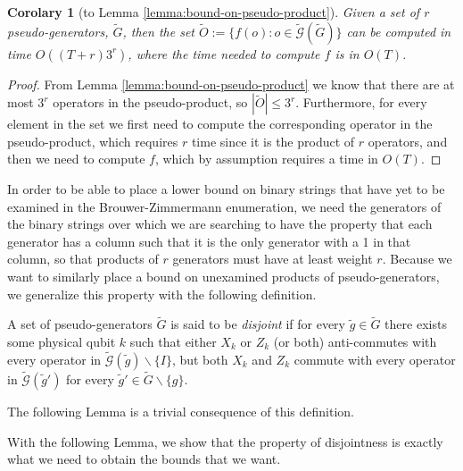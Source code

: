 \documentclass[twocolumn,showpacs,preprintnumbers,amsmath,amssymb,nofootinbib,pra,floatfix]{revtex4-1}
\newtheorem{corolary}{Corolary}
\newenvironment{definition}[1][Definition]{\begin{trivlist}
\item[\hskip \labelsep {\bfseries #1}]}{\end{trivlist}}
\newenvironment{remark}[1][Remark]{\begin{trivlist}
\item[\hskip \labelsep {\bfseries #1}]}{\end{trivlist}}
\newcommand{\set}{\tilde}
\newcommand{\genfun}{\tilde{\mathcal{G}}}
\begin{document}
\begin{corolary}[to Lemma \ref{lemma:bound-on-pseudo-product}]
\label{corolary:bound-on-pseudo-product}
Given a set of $r$ pseudo-generators, $\set G$, then the set $\set O:=\{f(o):o\in\genfun(\set G)\}$ can be computed in time $O((T+r) 3^r)$, where the time needed to compute $f$ is in $O(T)$.
\end{corolary}

\begin{proof}
From Lemma \ref{lemma:bound-on-pseudo-product} we know that there are at most $3^r$ operators in the pseudo-product, so $|\set O|\le 3^r$.  Furthermore, for every element in the set we first need to compute the corresponding operator in the pseudo-product, which requires $r$ time since it is the product of $r$ operators, and then we need to compute $f$, which by assumption requires a time in $O(T)$.
\end{proof}
\begin{remark}
In order to be able to place a lower bound on binary strings that have yet to be examined in the Brouwer-Zimmermann enumeration, we need the generators of the binary strings over which we are searching to have the property that each generator has a column such that it is the only generator with a 1 in that column, so that products of $r$ generators must have at least weight $r$.  Because we want to similarly place a bound on unexamined products of pseudo-generators, we generalize this property with the following definition.
\end{remark}

\begin{definition}
\label{definition:disjoint-pseudo-generators}
A set of pseudo-generators $\set G$ is said to be \emph{disjoint} if for every $\set g\in\set G$ there exists some physical qubit $k$ such that either $X_k$ or $Z_k$ (or both) anti-commutes with every operator in $\genfun(\set g)\backslash\{I\}$, but both $X_k$ and $Z_k$ commute with every operator in $\genfun(\set g')$ for every $\set g'\in\set G\backslash\{g\}$.
\end{definition}

\begin{remark}
The following Lemma is a trivial consequence of this definition.
\end{remark}

\begin{remark}
With the following Lemma, we show that the property of disjointness is exactly what we need to obtain the bounds that we want.
\end{remark}
\end{document}
